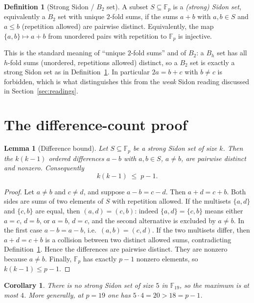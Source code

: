 \documentclass[11pt]{article}
\newtheorem{lemma}[theorem]{Lemma}
\newtheorem{corollary}[theorem]{Corollary}
\theoremstyle{definition}
\newtheorem{definition}[theorem]{Definition}
\theoremstyle{remark}
\newcommand{\F}{\mathbb{F}}
\begin{document}
\begin{definition}[Strong Sidon / $B_2$ set]\label{def:strong}
A subset $S \subseteq \F_p$ is a \emph{(strong) Sidon set}, equivalently a
$B_2$ set with unique $2$-fold sums, if the sums $a+b$ with $a,b \in S$ and
$a \le b$ (repetition allowed) are pairwise distinct. Equivalently, the map
$\{a,b\} \mapsto a+b$ from unordered pairs with repetition to $\F_p$ is
injective.
\end{definition}

This is the standard meaning of ``unique $2$-fold sums'' and of $B_2$: a
$B_h$ set has all $h$-fold sums (unordered, repetitions allowed) distinct, so a
$B_2$ set is exactly a strong Sidon set as in
Definition~\ref{def:strong}. In particular $2a = b + c$ with $b \ne c$ is
forbidden, which is what distinguishes this from the \emph{weak} Sidon reading
discussed in Section~\ref{sec:readings}.

\section{The difference-count proof}

\begin{lemma}[Difference bound]\label{lem:diff}
Let $S \subseteq \F_p$ be a strong Sidon set of size $k$. Then the $k(k-1)$
ordered differences $a - b$ with $a,b \in S$, $a \ne b$, are pairwise distinct
and nonzero. Consequently
\[
k(k-1) \;\le\; p - 1 .
\]
\end{lemma}

\begin{proof}
Let $a \ne b$ and $c \ne d$, and suppose $a - b = c - d$. Then
$a + d = c + b$. Both sides are sums of two elements of $S$ with repetition
allowed. If the multisets $\{a,d\}$ and $\{c,b\}$ are equal, then
$(a,d) = (c,b)$: indeed $\{a,d\} = \{c,b\}$ means either $a=c$, $d=b$, or
$a=b$, $d=c$, and the second alternative is excluded by $a \ne b$. In the first
case $a-b = a-b$, i.e.\ $(a,b) = (c,d)$. If the two multisets differ, then
$a+d = c+b$ is a collision between two distinct allowed sums, contradicting
Definition~\ref{def:strong}. Hence the differences are pairwise distinct.
They are nonzero because $a \ne b$. Finally, $\F_p$ has exactly $p-1$ nonzero
elements, so $k(k-1) \le p-1$.
\end{proof}

\begin{corollary}\label{cor:19}
There is no strong Sidon set of size $5$ in $\F_{19}$, so the maximum is at
most $4$. More generally, at $p = 19$ one has $5 \cdot 4 = 20 > 18 = p-1$.
\end{corollary}
\end{document}
